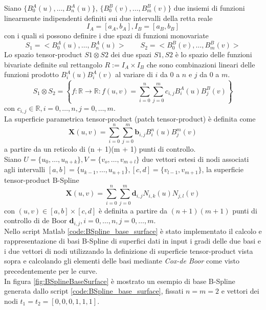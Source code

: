 \documentclass[a4paper, 12pt]{article}
\begin{document}
Siano $\{B^{A}_{0}(u), \dots, B^{A}_{n}(u) \}$, $\{ B^{B}_{0}(v), \dots, B^{B}_{m}(v) \}$
due insiemi di funzioni linearmente indipendenti definiti sui due intervalli della retta reale
$$ I_A = [a_A, b_A],  I_B = [a_B, b_B]$$
con i quali si possono definire i due spazi di funzioni monovariate
$$S_1 = < B^{A}_{0}(u), \dots, B^{A}_{n}(u) > \qquad S_2 = < B^{B}_{0}(v), \dots, B^{B}_{m}(v) >$$
Lo spazio tensor-product
$S1 \otimes S2$
dei due spazi $S1, S2$ è lo spazio delle funzioni bivariate definite sul rettangolo
$R:= I_A \times I_B$
che sono combinazioni lineari delle funzioni prodotto
$B^{A}_{i}(u) B^{A}_{i}(v)$
al variare di $i$ da $0$ a $n$ e $j$ da $0$ a $m$.
$$S_1 \otimes S_2 = \left\{ f : \mathbb{R} \rightarrow \mathbb{R}: f(u, v) = \sum_{i = 0}^{n}\sum_{j = 0}^{m} c_{i,j}B^A_i(u)B^B_j(v) \right\}$$
con $c_{i,j} \in \mathbb{R}, i=0,\dots, n, j=0,\dots,m$.\\
La superficie parametrica tensor-product (patch tensor-product) è definita come
$$\mathbf{X}(u, v) = \sum_{i = 0}^{n} \sum_{j = 0}^{m} \mathbf{b}_{i, j} B^{n}_{i}(u)B_{j}^{m}(v) $$
a partire da un reticolo di (n + 1)(m + 1) punti di controllo.\\
Siano $U = \{u_0, \dots, u_{n+k}  \}, V = \{ v_o, \dots, v_{m+l}   \}$ due vettori estesi di nodi associati agli intervalli $[a,b] = \{u_{k-1}, \dots, u_{n+1}   \}, [c,d] = \{ v_{l-1}, v_{m+1}\}$, la superficie tensor-product B-Spline $$\mathbf{X}(u, v) = \sum_{i = 0}^{n} \sum_{j = 0}^{m} \mathbf{d}_{i, j} N_{i,k}(u)N_{j,l}(v) $$
con $(u,v) \in [a,b] \times [c,d]$ è definita a partire da $(n+1)(m+1) $ punti di controllo di de Boor $\mathbf{d}_{i,j}, i=0,\dots, n, j=0, \dots, m$.\\
Nello script Matlab \ref{code:BSpline_base_surface} è stato implementato il calcolo e rappresentazione di basi B-Spline di superfici dati in input i gradi delle due basi e i due vettori di nodi utilizzando la definizione di superficie tensor-product vista sopra e calcolando gli elementi delle basi mediante \textit{Cox-de Boor} come visto precedentemente per le curve.\\
In figura \ref{fig:BSplineBaseSurface} è mostrato un esempio di base B-Spline generata dallo script \ref{code:BSpline_base_surface}, fissati $n = m= 2$ e vettori dei nodi $t_1 = t_2 =[0, 0, 0, 1, 1, 1]$.
\end{document}
